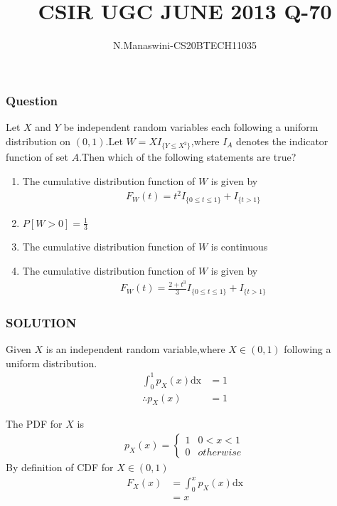 \documentclass{beamer}
\title{CSIR UGC JUNE 2013 Q-70}
\author{N.Manaswini-CS20BTECH11035}
\date{}
\begin{document}
\begin{frame}
\titlepage
\end{frame}
\begin{frame}
\frametitle{Question}

\begin{block}{}
Let $X$ and $Y$ be independent random variables each following a uniform distribution on $(0,1)$.Let $W=XI_{\{Y\leq X^2\}}$,where $I_A$ denotes the indicator function of set $A$.Then which of the following statements are true? 

 
\begin{enumerate}
    \item The cumulative distribution function of $W$ is given by
    \begin{align}
     F_W(t)=t^2I_{\{0\leq t \leq 1\}}+ I_{\{t > 1\}}
    \end{align}
    \item $P[W>0]=\frac{1}{3}$ 
    \item The cumulative distribution function of $W$ is continuous
    \item The cumulative distribution function of $W$ is given by
     \begin{align}
        F_W(t)=\frac{2+t^3}{3}I_{\{0\leq t \leq 1\}}+ I_{\{t > 1\}}
     \end{align}
\end{enumerate}
\end{block}

\end{frame}
\begin{frame}
\frametitle{SOLUTION}
Given $X$ is an independent random variable,where $X \in (0,1)$ following a uniform distribution.
\begin{align}
\int_{0}^{1} p_X(x) \mathrm{dx} &=1  \\
\therefore p_X(x)&=1 \label{px}
\end{align}

The PDF for $X$ is
\begin{align}
p_X(x) = 
\begin{cases}
     1 & 0 < x  < 1 \\
     0 & otherwise 
\end{cases}\label{1}
\end{align}
By definition of CDF for $X \in (0,1)$
\begin{align}
F_X(x)&=\int_{0}^{x} p_X(x) \mathrm{dx} \\
      &=x
\end{align}
\end{frame}
\end{document}
